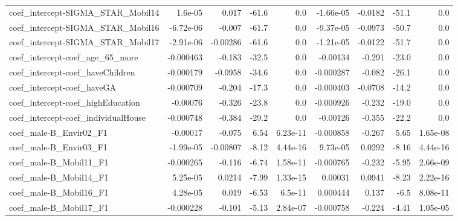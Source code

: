 \begin{tabular}{lrrrrrrrr}
coef\_intercept-SIGMA\_STAR\_Mobil14         &     1.6e-05 &        0.017 &   -61.6 &      0.0 &  -1.66e-05 &     -0.0182 &        -51.1 &           0.0 \\
coef\_intercept-SIGMA\_STAR\_Mobil16         &   -6.72e-06 &       -0.007 &   -61.7 &      0.0 &  -9.37e-05 &     -0.0973 &        -50.7 &           0.0 \\
coef\_intercept-SIGMA\_STAR\_Mobil17         &   -2.91e-06 &     -0.00286 &   -61.6 &      0.0 &  -1.21e-05 &     -0.0122 &        -51.7 &           0.0 \\
coef\_intercept-coef\_age\_65\_more           &   -0.000463 &       -0.183 &   -32.5 &      0.0 &   -0.00134 &      -0.291 &        -23.0 &           0.0 \\
coef\_intercept-coef\_haveChildren          &   -0.000179 &      -0.0958 &   -34.6 &      0.0 &  -0.000287 &      -0.082 &        -26.1 &           0.0 \\
coef\_intercept-coef\_haveGA                &   -0.000709 &       -0.204 &   -17.3 &      0.0 &  -0.000403 &     -0.0708 &        -14.2 &           0.0 \\
coef\_intercept-coef\_highEducation         &    -0.00076 &       -0.326 &   -23.8 &      0.0 &  -0.000926 &      -0.232 &        -19.0 &           0.0 \\
coef\_intercept-coef\_individualHouse       &   -0.000748 &       -0.384 &   -29.2 &      0.0 &   -0.00126 &      -0.355 &        -22.2 &           0.0 \\
coef\_male-B\_Envir02\_F1                    &    -0.00017 &       -0.075 &    6.54 & 6.23e-11 &  -0.000858 &      -0.267 &         5.65 &      1.65e-08 \\
coef\_male-B\_Envir03\_F1                    &   -1.99e-05 &     -0.00807 &   -8.12 & 4.44e-16 &   9.73e-05 &      0.0292 &        -8.16 &      4.44e-16 \\
coef\_male-B\_Mobil11\_F1                    &   -0.000265 &       -0.116 &   -6.74 & 1.58e-11 &  -0.000765 &      -0.232 &        -5.95 &      2.66e-09 \\
coef\_male-B\_Mobil14\_F1                    &    5.25e-05 &       0.0214 &   -7.99 & 1.33e-15 &    0.00031 &      0.0941 &        -8.23 &      2.22e-16 \\
coef\_male-B\_Mobil16\_F1                    &    4.28e-05 &        0.019 &   -6.53 &  6.5e-11 &   0.000444 &       0.137 &         -6.5 &      8.08e-11 \\
coef\_male-B\_Mobil17\_F1                    &   -0.000228 &       -0.101 &   -5.13 & 2.84e-07 &  -0.000758 &      -0.224 &        -4.41 &      1.05e-05 \\

\end{tabular}
